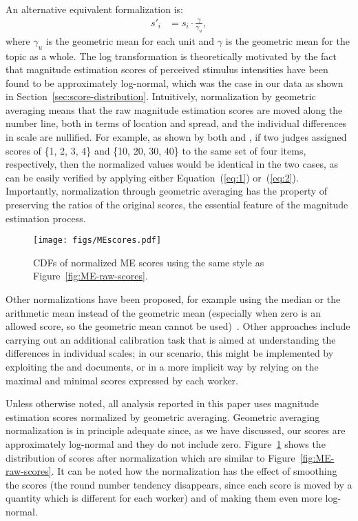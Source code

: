 An alternative equivalent formalization is: 
\begin{align}
s'_i &= s_i \cdot \frac{\gamma}{\gamma_u}, 
\label{eq:2}
\end{align}
where $\gamma_u$ is the geometric mean for each unit and $\gamma$ is
the geometric mean for the topic as a whole.
The log transformation is theoretically motivated by the fact that
magnitude estimation scores of perceived stimulus intensities have been
found to be approximately log-normal, which was the case in our data as
shown in Section~\ref{sec:score-distribution}. Intuitively,
normalization by geometric averaging means that the raw magnitude
estimation scores are moved along the number line, both in terms of
location and spread, and the individual differences in scale are
nullified.
For example, as shown by both 
\citet{moskowitz:1977} and  
\citet{McG03}, 
if two judges assigned scores of \{1, 2, 3, 4\} and \{10, 20, 30, 40\}
to the same set of four items, respectively, then the normalized values
would be identical in the two cases, as can be easily verified by
applying either Equation~(\ref{eq:1}) or~(\ref{eq:2}).
Importantly, normalization through geometric averaging has the property
of preserving the ratios of the original scores, the essential feature
of the magnitude estimation process.
%
\begin{figure}[tp]
  \centering
  \texttt{[image: figs/MEscores.pdf]}
  \caption{CDFs of normalized ME scores using the
    same style as Figure~\ref{fig:ME-raw-scores}.
  \label{fig:ME-norm-scores}}
\end{figure}

Other normalizations have been proposed, 
for example using the median or the arithmetic mean instead of the
geometric mean (especially when zero is an allowed score, so the
geometric mean cannot be used)~\citet{moskowitz:1977}.
Other approaches include carrying out an additional calibration task
that is aimed at understanding the differences in individual scales;
in our scenario, this might be implemented by exploiting the \nkn and
\hkh documents, or in a more implicit way by relying on the maximal
and minimal scores expressed by each worker.

Unless otherwise noted, all analysis reported in this paper uses
magnitude estimation scores normalized by geometric averaging.
Geometric averaging normalization is in principle adequate since, as
we have discussed, our scores are approximately log-normal and they do
not include zero. 
Figure~\ref{fig:ME-norm-scores} shows the distribution of scores after
normalization which are similar to 
Figure~\ref{fig:ME-raw-scores}.
It can be noted how the normalization has the effect of smoothing the
scores (the round number tendency disappears, since each score is moved by a
quantity which is different for each worker) and of making them even
more log-normal.


